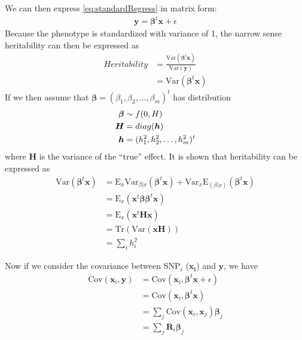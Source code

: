 			We can then express \cref{eq:standardRegress} in matrix form:
			\begin{align}
				\boldsymbol{y}=\boldsymbol{\beta}^t\boldsymbol{x}+\epsilon
				\label{eq:matrixRegress}
			\end{align}
			Because the phenotype is standardized with variance of 1, the narrow sense heritability can then be expressed as
			\begin{align}
				Heritability& = \frac{\mathrm{Var}(\boldsymbol{\beta}^t\boldsymbol{x})}{\mathrm{Var}(\boldsymbol{y})} \nonumber\\
				&=\mathrm{Var}(\boldsymbol{\beta}^t\boldsymbol{x})
			\end{align}
			If we then assume that $\boldsymbol{\beta} = (\beta_1, \beta_2,\dots,\beta_m)^t$ has distribution
			\begin{align*}
				\boldsymbol{\beta}&\sim f(0,\boldmath{H})\\
				\boldsymbol{H}&=diag(\boldsymbol{h})\\
				\boldsymbol{h}&=(h_1^2,h_2^2,\dots,h_m^2)^t
			\end{align*}
			where $\boldsymbol{H}$ is the variance of the ``true'' effect. 
			It is shown that heritability can be expressed as %
			\begin{align}
			\mathrm{Var}(\boldsymbol{\beta}^t\boldsymbol{x}) &= \mathrm{E}_x\mathrm{Var}_{\beta|x}(\boldsymbol{\beta}^t\boldsymbol{x})+\mathrm{Var}_x\mathrm{E}_{(\beta|x)}(\boldsymbol{\beta}^t\boldsymbol{x}) \nonumber\\
			&=\mathrm{E}_x(\boldsymbol{x}^t\boldsymbol{\beta\beta}^t\boldsymbol{x}) \nonumber\\ 
			&= \mathrm{E}_x(\boldsymbol{x}^t\boldsymbol{Hx}) \nonumber\\
			&=\mathrm{Tr}(\mathrm{Var}(\boldsymbol{x}\boldsymbol{H})) \nonumber\\
			&=\sum_ih_i^2
			\label{eq:proveHerit}
			\end{align}
			
			Now if we consider the covariance between \gls{SNP}$_i$ ($\boldsymbol{x_i}$) and $\boldsymbol{y}$, we have
			\begin{align}
			 \mathrm{Cov}(\boldsymbol{x}_i,\boldsymbol{y}) &= \mathrm{Cov}(\boldsymbol{x}_i,\boldsymbol{\beta}^t\boldsymbol{x}+\epsilon) \nonumber\\
			 &=\mathrm{Cov}(\boldsymbol{x}_i,\boldsymbol{\beta}^t\boldsymbol{x}) \nonumber\\
			 &=\sum_j{\mathrm{Cov}(\boldsymbol{x}_i,\boldsymbol{x}_j)\boldsymbol{\beta}_j} \nonumber\\
			 &=\sum_j{\boldsymbol{R}_i\boldsymbol{\beta}_j}
			 \label{eq:covPhenoTrue}
			\end{align}
			
